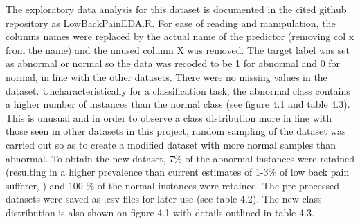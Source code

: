The exploratory data analysis for this dataset is documented in the cited github repository as LowBackPainEDA.R.\newline
For ease of reading and  manipulation, the columns names were replaced by the actual name of the predictor (removing col x from the name) and the unused column X was removed.\newline
The target label was set as abnormal or normal so the data was recoded to be 1 for abnormal and 0 for normal, in line with the other datasets. There were no missing values in the dataset.\newline
Uncharacteristically for a classification task, the abnormal class contains a higher number of instances than the normal class (see figure 4.1 and table 4.3). This is unusual and in order to observe a class distribution more in line with those seen in other datasets in this project, random sampling of the dataset was  carried out so as to create a modified dataset with more normal samples than abnormal. \newline
To obtain the new dataset, 7\% of the abnormal instances were  retained (resulting in a higher prevalence than current estimates of 1-3\% of low back pain sufferer, \citep{Jordan:2009vx}) and 100 \% of the normal instances were retained. The pre-processed datasets were saved as .csv files for later use (see table 4.2). The new class distribution is also shown on figure 4.1 with details outlined in table 4.3.\newline

